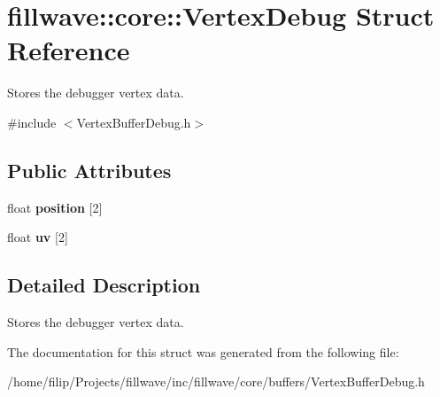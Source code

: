 \hypertarget{structfillwave_1_1core_1_1VertexDebug}{}\section{fillwave\+:\+:core\+:\+:Vertex\+Debug Struct Reference}
\label{structfillwave_1_1core_1_1VertexDebug}


Stores the debugger vertex data.  




{\ttfamily \#include $<$Vertex\+Buffer\+Debug.\+h$>$}

\subsection*{Public Attributes}
\begin{DoxyCompactItemize}
\item 
\hypertarget{structfillwave_1_1core_1_1VertexDebug_a9bf65c6dda6875835a32d766e9afac01}{}float {\bfseries position} \mbox{[}2\mbox{]}\label{structfillwave_1_1core_1_1VertexDebug_a9bf65c6dda6875835a32d766e9afac01}

\item 
\hypertarget{structfillwave_1_1core_1_1VertexDebug_a36f8231325d7a86dc5c07c6356d62ab1}{}float {\bfseries uv} \mbox{[}2\mbox{]}\label{structfillwave_1_1core_1_1VertexDebug_a36f8231325d7a86dc5c07c6356d62ab1}

\end{DoxyCompactItemize}


\subsection{Detailed Description}
Stores the debugger vertex data. 

The documentation for this struct was generated from the following file\+:\begin{DoxyCompactItemize}
\item 
/home/filip/\+Projects/fillwave/inc/fillwave/core/buffers/Vertex\+Buffer\+Debug.\+h\end{DoxyCompactItemize}
